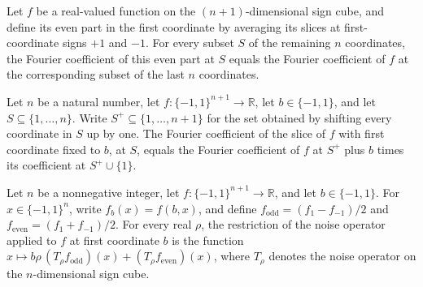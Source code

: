 \begin{theorem}
\label{FABL.fourierCoeff_firstCoordinateEvenPart}
\leanok
{}
Let $f$ be a real-valued function on the $(n+1)$-dimensional sign cube, and define its
even part in the first coordinate by averaging its slices at first-coordinate signs $+1$
and $-1$. For every subset $S$ of the remaining $n$ coordinates, the Fourier coefficient
of this even part at $S$ equals the Fourier coefficient of $f$ at the corresponding
subset of the last $n$ coordinates.
\end{theorem}

\begin{theorem}
\label{FABL.fourierCoeff_slice_eq_tail_add_sign_mul_insert}
\leanok
{}
Let $n$ be a natural number, let $f:\{-1,1\}^{n+1}\to\mathbb R$, let
$b\in\{-1,1\}$, and let $S\subseteq\{1,\ldots,n\}$. Write
$S^+\subseteq\{1,\ldots,n+1\}$ for the set obtained by shifting every coordinate in
$S$ up by one. The Fourier coefficient of the slice of $f$ with first coordinate fixed
to $b$, at $S$, equals the Fourier coefficient of $f$ at $S^+$ plus $b$ times its
coefficient at $S^+\cup\{1\}$.
\end{theorem}

\begin{theorem}
\label{FABL.noiseOperator_firstCoordinateSlice}
\leanok
{}
Let $n$ be a nonnegative integer, let $f\colon\{−1,1\}^{n+1}\to\mathbb R$, and let
$b\in\{−1,1\}$. For $x\in\{−1,1\}^n$, write $f_b(x)=f(b,x)$, and define
$f_{\mathrm{odd}}=(f_1-f_{-1})/2$ and $f_{\mathrm{even}}=(f_1+f_{-1})/2$. For every real
$\rho$, the restriction of the noise operator applied to $f$ at first coordinate $b$ is
the function $x\mapsto b\rho\,(T_\rho f_{\mathrm{odd}})(x)+(T_\rho
f_{\mathrm{even}})(x)$, where $T_\rho$ denotes the noise operator on the $n$-dimensional
sign cube.
\end{theorem}

